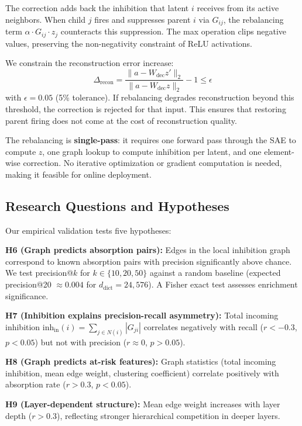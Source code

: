 \documentclass{article}
\begin{document}
The correction adds back the inhibition that latent $i$ receives from its active neighbors. When child $j$ fires and suppresses parent $i$ via $G_{ij}$, the rebalancing term $\alpha \cdot G_{ij} \cdot z_j$ counteracts this suppression. The max operation clips negative values, preserving the non-negativity constraint of ReLU activations.

We constrain the reconstruction error increase:
\begin{equation}
\Delta_{\text{recon}} = \frac{\|a - W_{\text{dec}} z'\|_2}{\|a - W_{\text{dec}} z\|_2} - 1 \leq \epsilon
\end{equation}
with $\epsilon = 0.05$ (5\% tolerance). If rebalancing degrades reconstruction beyond this threshold, the correction is rejected for that input. This ensures that restoring parent firing does not come at the cost of reconstruction quality.

The rebalancing is \textbf{single-pass}: it requires one forward pass through the SAE to compute $z$, one graph lookup to compute inhibition per latent, and one element-wise correction. No iterative optimization or gradient computation is needed, making it feasible for online deployment.

\subsection{Research Questions and Hypotheses}
\label{sec:hypotheses}

Our empirical validation tests five hypotheses:

\textbf{H6 (Graph predicts absorption pairs):} Edges in the local inhibition graph correspond to known absorption pairs with precision significantly above chance. We test precision@$k$ for $k \in \{10, 20, 50\}$ against a random baseline (expected precision@20 $\approx 0.004$ for $d_{\text{dict}} = 24{,}576$). A Fisher exact test assesses enrichment significance.

\textbf{H7 (Inhibition explains precision-recall asymmetry):} Total incoming inhibition $\text{inh}_{\text{in}}(i) = \sum_{j \in N(i)} |G_{ji}|$ correlates negatively with recall ($r < -0.3$, $p < 0.05$) but not with precision ($r \approx 0$, $p > 0.05$).

\textbf{H8 (Graph predicts at-risk features):} Graph statistics (total incoming inhibition, mean edge weight, clustering coefficient) correlate positively with absorption rate ($r > 0.3$, $p < 0.05$).

\textbf{H9 (Layer-dependent structure):} Mean edge weight increases with layer depth ($r > 0.3$), reflecting stronger hierarchical competition in deeper layers.
\end{document}
